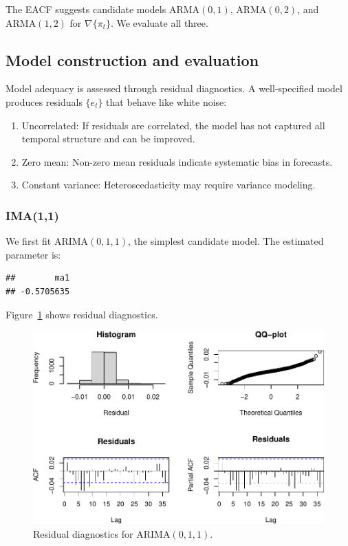 \documentclass[final,11pt]{article}
\theoremstyle{plain}
\theoremstyle{remark}
\begin{document}
The EACF suggests candidate models ARMA$(0,1)$, ARMA$(0,2)$, and
ARMA$(1,2)$ for $\nabla\{\pi_t\}$. We evaluate all three.

\hypertarget{model-construction-and-evaluation}{%
\subsection{Model construction and
evaluation}\label{model-construction-and-evaluation}}

Model adequacy is assessed through residual diagnostics. A well-specified
model produces residuals $\{e_t\}$ that behave like white noise:
\begin{enumerate}
\item Uncorrelated: If residuals are correlated, the model has not captured
all temporal structure and can be improved.
\item Zero mean: Non-zero mean residuals indicate systematic bias in forecasts.
\item Constant variance: Heteroscedasticity may require variance modeling.
\end{enumerate}

\hypertarget{ima11}{%
\subsubsection{IMA(1,1)}\label{ima11}}

We first fit ARIMA$(0,1,1)$, the simplest candidate model. The estimated
parameter is:

\begin{verbatim}
##        ma1
## -0.5705635
\end{verbatim}

Figure~\ref{fig:resv} shows residual diagnostics.

\begin{figure}
\includegraphics{paper_files/figure-latex/unnamed-chunk-9-1.pdf}
\caption{Residual diagnostics for ARIMA$(0,1,1)$.}
\label{fig:resv}
\end{figure}
\end{document}
